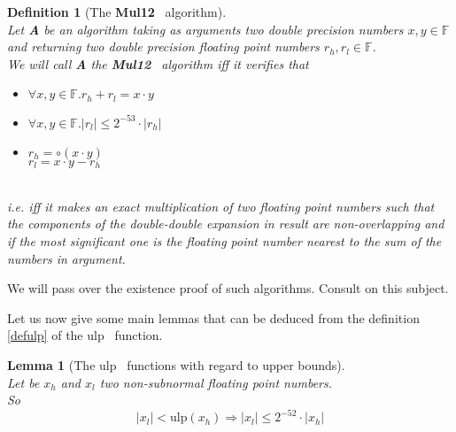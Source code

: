\documentclass[a4paper,10pt,twoside]{article}
\newtheorem{lemma}[theorem]{Lemma}
\newtheorem{definition}[theorem]{Definition}
\newcommand{\F}{\ensuremath{\mathbb {F}}}
\newcommand{\hi}{\ensuremath{\mathit{h}}}
\newcommand{\lo}{\ensuremath{\mathit{l}}}
\newcommand{\Mul}{{\bf Mul12}}
\newcommand{\mUlp}{\ensuremath{\mathrm{ulp}}}
\begin{document}
\begin{definition}[The \Mul~ algorithm] \label{muldef} ~ \\
Let {\bf A} be an algorithm taking as arguments two double precision numbers $x,y \in \F$ and
returning two double precision floating point numbers $r_\hi, r_\lo \in \F$.\\
We will call {\bf A} the \Mul~ algorithm iff it verifies that\\
\begin{itemize}
\item $\forall x,y \in \F. r_\hi + r_\lo = x \cdot y$
\item $\forall x,y \in \F. \left \vert r_\lo \right \vert \leq 2^{-53} \cdot \left \vert r_\hi \right \vert$
\item $r_\hi = \circ\left( x \cdot y \right)$ \\
$r_\lo = x \cdot y - r_\hi$
\end{itemize} ~\\
i.e. iff it makes an exact multiplication of two floating point numbers such that
the components of the double-double expansion in result are non-overlapping
and if the most significant one is the floating point number nearest to the
sum of the numbers in argument.
\end{definition}
We will pass over the existence proof of such algorithms. Consult \cite{Dek71} on this subject. \par
Let us now give some main lemmas that can be deduced from the definition \ref{defulp} of the
$\mUlp$~ function.
\begin{lemma}[The $\mUlp$~ functions with regard to upper bounds] \label{ulpmajor} ~ \\
Let be $x_\hi$ and $x_\lo$ two non-subnormal floating point numbers. \\
So
$$\left \vert x_\lo \right \vert < \mUlp\left( x_\hi \right) \Rightarrow
\left \vert x_\lo \right \vert \leq 2^{-52} \cdot \left \vert x_\hi \right \vert$$
\end{lemma}
\end{document}
